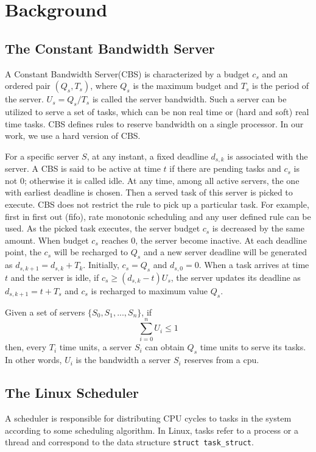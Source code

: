 \chapter{Background\label{chap:background}}
\section{The Constant Bandwidth Server\label{sec:CBS}}
A Constant Bandwidth Server(CBS) is characterized by a budget $c_s$ and
an ordered pair $(Q_s, T_s)$, where $Q_s$ is the maximum budget and $T_s$
is the period of the server. $U_s = Q_s/T_s$ is called the server bandwidth.
Such a server can be utilized to serve a set of
tasks, which can be non real time or (hard and soft) real time tasks. 
CBS defines rules to reserve bandwidth on a single processor.
In our work, we use a hard version of CBS.

For a specific server $S$, at any instant, a fixed deadline $d_{s,k}$ is 
associated with the server. A CBS is said to be active at time $t$ if there 
are pending tasks and $c_s$ is not 0; otherwise it is called idle. 
At any time, among all active servers,
the one with earliest deadline is chosen. Then a served task of this server 
is picked to execute. CBS does not restrict the rule to pick up a particular 
task. For example, first in first out (fifo), rate monotonic scheduling and
any user defined rule can be used.
As the picked task executes, the server budget $c_s$ is decreased by the 
same amount. When budget $c_s$ reaches 0, the server become inactive. At 
each deadline point, the $c_s$ will be recharged to $Q_s$ and a new server 
deadline will be generated as $d_{s, k+1} = d_{s,k} + T_k$. Initially, 
$c_s = Q_s$ and $d_{s, 0} = 0$. When a task arrives at time $t$ and the 
server is idle, if $c_s \ge (d_{s,k} - t)U_s$, the server updates its 
deadline as $d_{s, k+1} = t + T_s$ and $c_s$ is recharged to maximum 
value $Q_s$.

Given a set of servers $\{S_0, S_1, ... , S_n\}$, if
\[
	\sum_{i=0}^n U_i \le 1
\]
then, every $T_i$ time units, a server $S_i$ can obtain $Q_s$ time units 
to serve its tasks. In other words, $U_i$ is the bandwidth a server $S_i$
reserves from a cpu.

\section{The Linux Scheduler\label{sec:LinuxSched}}
A scheduler is responsible for distributing CPU cycles to tasks in the system
according to some scheduling algorithm. In Linux, tasks refer to a process or 
a thread and correspond to the data structure \texttt{struct task\_struct}.

